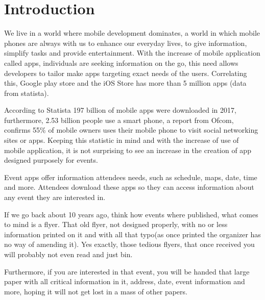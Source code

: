 
\chapter{Introduction}
\label{chap:intro}
We live in a world where mobile development dominates, a world in which mobile phones are always with us to enhance our everyday lives, to give information, simplify tasks and provide entertainment. With the increase of mobile application called apps, individuals are seeking information on the go, this need allows developers to tailor make apps targeting exact needs of the users. Correlating this, Google play store and the iOS Store has more than 5 million apps (data from statista).

According to Statista 197 billion of mobile apps were downloaded in 2017, furthermore, 2.53 billion people use a smart phone, a report from Ofcom, confirms 55\% of mobile owners uses their mobile phone to visit social networking sites or apps. 
Keeping this statistic in mind and with the increase of use of mobile application, it is not surprising to see an increase in the creation of app designed purposely for events.

Event apps offer information attendees needs, such as schedule, maps, date, time and more. Attendees download these apps so they can access information about any event they are interested in.

If we go back about 10 years ago, think how events where published, what comes to mind is a flyer. That old flyer, not designed properly, with no or less information printed on it and with all that typo(as once printed the organizer has no way of amending it). Yes exactly, those tedious flyers, that once received you will probably not even read and just bin.  

Furthermore, if you are interested in that event, you will be handed that large paper with all critical information in it, address, date, event information and more, hoping it will not get lost in a mass of other papers.

